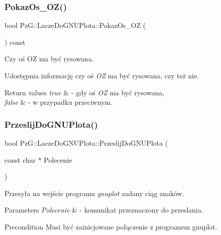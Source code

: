 \subsubsection{\texorpdfstring{Pokaz\+Os\+\_\+\+O\+Z()}{PokazOs\_OZ()}\hspace{0.1cm}{\footnotesize\ttfamily [2/2]}}
{\footnotesize\ttfamily bool Pz\+G\+::\+Lacze\+Do\+G\+N\+U\+Plota\+::\+Pokaz\+Os\+\_\+\+OZ (\begin{DoxyParamCaption}{ }\end{DoxyParamCaption}) const\hspace{0.3cm}{\ttfamily [inline]}}



Czy oś OZ ma być rysowana. 

Udostępnia informację czy oś {\itshape OZ} ma być rysowana, czy też nie. 
\begin{DoxyRetVals}{Return values}
{\em true} & -\/ gdy oś {\itshape OZ} ma być rysowana, \\
\hline
{\em false} & -\/ w przypadku przeciwnym. \\
\hline
\end{DoxyRetVals}
\mbox{\label{classPzG_1_1LaczeDoGNUPlota_a5063854b7232a7951d120a21df63f2b7}} 
\subsubsection{\texorpdfstring{Przeslij\+Do\+G\+N\+U\+Plota()}{PrzeslijDoGNUPlota()}}
{\footnotesize\ttfamily bool Pz\+G\+::\+Lacze\+Do\+G\+N\+U\+Plota\+::\+Przeslij\+Do\+G\+N\+U\+Plota (\begin{DoxyParamCaption}\item[{const char $\ast$}]{Polecenie }\end{DoxyParamCaption})\hspace{0.3cm}{\ttfamily [protected]}}

Przesyła na wejście programu {\itshape gnuplot} zadany ciąg znaków. 
\begin{DoxyParams}{Parameters}
{\em Polecenie} & -\/ komunikat przeznaczony do przeslania.\\
\hline
\end{DoxyParams}
\begin{DoxyPrecond}{Precondition}
Musi być zainicjowane połączenie z programem gnuplot.
\end{DoxyPrecond}

